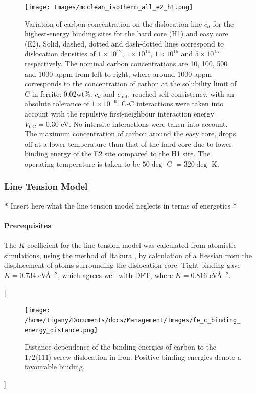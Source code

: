 \documentclass[a4paper,11pt]{article}
\numberwithin{equation}{chapter}
\numberwithin{listing}{chapter}
\begin{document}
\begin{landscape}
 \begin{figure}
  \texttt{[image: Images/mcclean\_isotherm\_all\_e2\_h1.png]}
   \caption{Variation of carbon concentration on the dislocation line $c_d$ for the highest-energy binding sites for the hard core (H1) and easy core (E2). Solid, dashed, dotted and dash-dotted lines correspond to dislocation densities of $1\times10^{12}$, $1\times10^{14}$, $1\times10^{15}$ and $5\times10^{15}$ respectively. The nominal carbon concentrations are 10, 100, 500 and 1000 appm from left to right, where around 1000 appm corresponds to the concentration of carbon at the solubility limit of C in ferrite: 0.02wt\%. $c_d$ and $c_{\text{bulk}}$ reached self-consistency, with an absolute tolerance of $1\times 10^{-6}$. C-C interactions were taken into account with the repulsive first-neighbour interaction energy $V_{\text{CC}}=0.30$ eV. No intersite interactions were taken into account. The maximum concentration of carbon around the easy core, drops off at a lower temperature than that of the hard core due to lower binding energy of the E$2$ site compared to the H1 site. The operating temperature is taken to be $50\deg$ C $= 320 \deg$ K.}\label{cdhardeasy}
\end{figure}
\end{landscape}





\subsubsection{Line Tension Model}
\label{sec:org3d13e26}
\label{sec:ltmodel}

\textbf{*} Insert here what the line tension model neglects in terms of energetics \textbf{*}
\paragraph{Prerequisites}
\label{sec:orgdce83da}

The \(K\) coefficient for the line tension model was calculated from atomistic simulations, using
the method of Itakura \cite{Itakura2012}, by calculation of a Hessian from the displacement of
atoms surrounding the dislocation core. Tight-binding gave \(K = 0.734\) eV\AA{}\(^{-2}\), which agrees well
with DFT, where \(K = 0.816\) eV\AA{}\(^{-2}\).


[\begin{figure}[htbp]
\centering
\texttt{[image: /home/tigany/Documents/docs/Management/Images/fe\_c\_binding\_energy\_distance.png]}
\caption{Distance dependence of the binding energies of carbon to the \(1/2\langle 111 \rangle\) screw dislocation in iron. Positive binding energies denote a favourable binding. \label{distancedep}}
\end{figure}]
\end{document}
